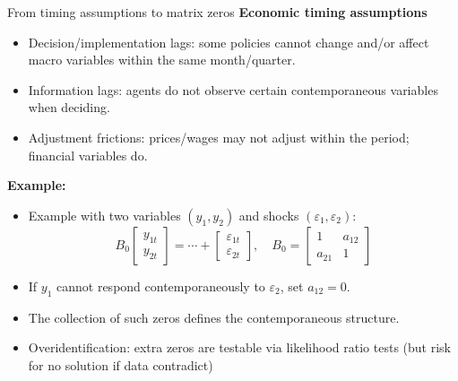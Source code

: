 \documentclass{beamer}
\begin{document}
\begin{frame}{From timing assumptions to matrix zeros}
\small
\textbf{Economic timing assumptions}
\begin{itemize}
  \item Decision/implementation lags: some policies cannot change and/or affect macro variables within the same month/quarter.
  \item Information lags: agents do not observe certain contemporaneous variables when deciding.
  \item Adjustment frictions: prices/wages may not adjust within the period; financial variables do.
\end{itemize}

\textbf{Example:}
\begin{itemize}
  \item Example with two variables $(y_1, y_2)$ and shocks $(\varepsilon_1, \varepsilon_2)$:
  \[
    B_0 \begin{bmatrix} y_{1t} \\ y_{2t} \end{bmatrix} = \cdots + \begin{bmatrix} \varepsilon_{1t} \\ \varepsilon_{2t} \end{bmatrix}, 
    \quad
    B_0 = \begin{bmatrix} 1 & a_{12} \\ a_{21} & 1 \end{bmatrix}
  \]
  \item If $y_1$ cannot respond contemporaneously to $\varepsilon_2$, set $a_{12}=0$.
  \item The collection of such zeros defines the contemporaneous structure.
  \item   Overidentification: extra zeros are testable via likelihood ratio tests (but risk for no solution if data contradict)
\end{itemize}
\end{frame}
\end{document}

